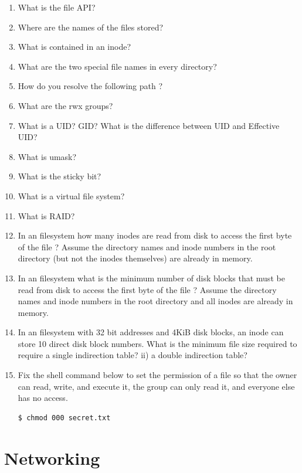 \begin{enumerate}
\item What is the file API?
\item Where are the names of the files stored?
\item What is contained in an inode?
\item What are the two special file names in every directory?
\item How do you resolve the following path ?
\item What are the rwx groups?
\item What is a UID? GID? What is the difference between UID and Effective UID?
\item What is umask?
\item What is the sticky bit?
\item What is a virtual file system?
\item What is RAID?
\item In an  filesystem how many inodes are read from disk to access the first byte of the file ? Assume the directory names and inode numbers in the root directory (but not the inodes themselves) are already in memory.

\item In an  filesystem what is the minimum number of disk blocks that must be read from disk to access the first byte of the file ? Assume the directory names and inode numbers in the root directory and all inodes are already in memory.

\item In an  filesystem with 32 bit addresses and 4KiB disk blocks, an inode can store 10 direct disk block numbers. What is the minimum file size required to require a single indirection table? ii) a double indirection table?

\item Fix the shell command  below to set the permission of a file  so that the owner can read, write, and execute it, the group can only read it, and everyone else has no access.

\begin{lstlisting}[language=bash]
$ chmod 000 secret.txt
\end{lstlisting}

\end{enumerate}

\section{Networking}

